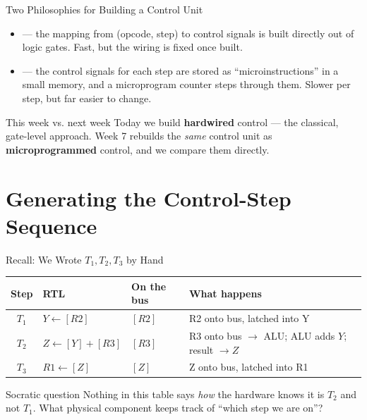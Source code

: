 \documentclass[aspectratio=169]{beamer}
\begin{document}
\begin{frame}{Two Philosophies for Building a Control Unit}
  \begin{itemize}
    \item {} --- the mapping from (opcode, step) to control
      signals is built directly out of logic gates. Fast, but the wiring is fixed
      once built.
    \item {} --- the control signals for each step are
      stored as ``microinstructions'' in a small memory, and a microprogram
      counter steps through them. Slower per step, but far easier to change.
  \end{itemize}
  \begin{alertblock}{This week vs. next week}
    Today we build \textbf{hardwired} control --- the classical, gate-level
    approach. Week 7 rebuilds the \emph{same} control unit as
    \textbf{microprogrammed} control, and we compare them directly.
  \end{alertblock}
\end{frame}


\section{Generating the Control-Step Sequence}

\begin{frame}{Recall: We Wrote $T_1, T_2, T_3$ by Hand}
  \footnotesize
  \begin{tabular}{@{}clll@{}}
    \toprule
    \textbf{Step} & \textbf{RTL} & \textbf{On the bus} & \textbf{What happens} \\
    \midrule
    $T_1$ & $Y \gets [R2]$            & $[R2]$      & R2 onto bus, latched into Y \\
    $T_2$ & $Z \gets [Y] + [R3]$      & $[R3]$      & R3 onto bus $\to$ ALU; ALU adds $Y$; result $\to Z$ \\
    $T_3$ & $R1 \gets [Z]$            & $[Z]$       & Z onto bus, latched into R1 \\
    \bottomrule
  \end{tabular}
  \vspace{0.3cm}
  \begin{block}{Socratic question}
    Nothing in this table says \emph{how} the hardware knows it is $T_2$ and not
    $T_1$. What physical component keeps track of ``which step we are on''?
  \end{block}
\end{frame}
\end{document}
